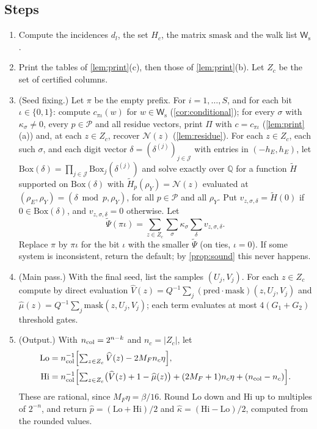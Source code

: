 \documentclass[11pt,letterpaper]{article}
\theoremstyle{definition}
\theoremstyle{remark}
\newcommand{\Q}{\mathbb Q}
\newcommand{\smask}{\mathrm{smask}}
\newcommand{\mask}{\mathrm{mask}}
\newcommand{\pred}{\mathrm{pred}}
\newcommand{\Bx}{\mathrm{Box}}
\newcommand{\cP}{\mathcal P}
\newcommand{\cJ}{\mathcal J}
\newcommand{\Ws}{\mathsf W_{\mathrm s}}
\newcommand{\phat}{\widehat p}
\newcommand{\khat}{\widehat\kappa}
\begin{document}
\subsection{Steps}
\begin{enumerate}[label=\textbf{Step~\arabic*.},leftmargin=*]
\item Compute the incidences \(d_l\), the set \(H_c\), the matrix
\(\smask\) and the walk list \(\Ws\).
\item Print the tables of \cref{lem:print}(c), then those of
\cref{lem:print}(b). Let \(Z_c\) be the set of certified columns.
\item (Seed fixing.) Let \(\pi\) be the empty prefix. For
\(i=1,\dots,S\), and for each bit \(\iota\in\{0,1\}\): compute
\(c_{\pi\iota}(w)\) for \(w\in\Ws\) (\cref{cor:conditional}); for every
\(\sigma\) with \(\kappa_\sigma\ne0\), every \(p\in\cP\) and all residue
vectors, print \(\Pi\) with \(c=c_{\pi\iota}\) (\cref{lem:print}(a)) and,
at each \(z\in Z_c\), recover \(\mathcal N(z)\) (\cref{lem:residue}).
For each \(z\in Z_c\), each such \(\sigma\), and each digit vector
\(\delta=(\delta^{(j)})_{j\in\cJ}\) with entries in \((-h_E,h_E)\), let
\(\Bx(\delta)=\prod_{j\in\cJ}\Bx_j(\delta^{(j)})\) and solve exactly over
\(\Q\) for a function \(\widetilde H\) supported on \(\Bx(\delta)\) with
\(\widetilde H_p(\rho_Y)=\mathcal N(z)\) evaluated at
\((\rho_E,\rho_Y)=(\delta\bmod p,\rho_Y)\), for all \(p\in\cP\) and all
\(\rho_Y\). Put \(v_{z,\sigma,\delta}=\widetilde H(0)\) if \(0\in\Bx(\delta)\),
and \(v_{z,\sigma,\delta}=0\) otherwise. Let
\[
 \widetilde\Psi(\pi\iota)=\sum_{z\in Z_c}\sum_\sigma\kappa_\sigma\sum_\delta v_{z,\sigma,\delta}.
\]
Replace \(\pi\) by \(\pi\iota\) for the bit \(\iota\) with the smaller
\(\widetilde\Psi\) (on ties, \(\iota=0\)). If some system is
inconsistent, return the default; by \cref{prop:sound} this never
happens.
\item (Main pass.) With the final seed, list the samples
\((U_j,V_j)\). For each \(z\in Z_c\) compute by direct evaluation
\(\widehat V(z)=Q^{-1}\sum_j(\pred\cdot\mask)(z,U_j,V_j)\) and
\(\widehat\mu(z)=Q^{-1}\sum_j\mask(z,U_j,V_j)\); each term evaluates at
most \(4(G_1+G_2)\) threshold gates.
\item (Output.) With \(n_{\rm col}=2^{n-k}\) and \(n_c=|Z_c|\), let
\begin{align*}
 \mathrm{Lo}&=n_{\rm col}^{-1}\Bigl[\textstyle\sum_{z\in Z_c}\widehat V(z)-2M_Fn_c\eta\Bigr],\\
 \mathrm{Hi}&=n_{\rm col}^{-1}\Bigl[\textstyle\sum_{z\in Z_c}\bigl(\widehat V(z)+1-\widehat\mu(z)\bigr)
 +(2M_F+1)n_c\eta+(n_{\rm col}-n_c)\Bigr].
\end{align*}
These are rational, since \(M_F\eta=\beta/16\). Round \(\mathrm{Lo}\) down
and \(\mathrm{Hi}\) up to multiples of \(2^{-n}\), and return
\(\phat=(\mathrm{Lo}+\mathrm{Hi})/2\) and
\(\khat=(\mathrm{Hi}-\mathrm{Lo})/2\), computed from the rounded values.
\end{enumerate}
\end{document}
